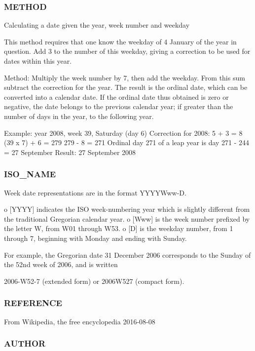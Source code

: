 \subsubsection*{M\+E\+T\+H\+OD}

Calculating a date given the year, week number and weekday

This method requires that one know the weekday of 4 January of the year in question. Add 3 to the number of this weekday, giving a correction to be used for dates within this year.

Method\+: Multiply the week number by 7, then add the weekday. From this sum subtract the correction for the year. The result is the ordinal date, which can be converted into a calendar date. If the ordinal date thus obtained is zero or negative, the date belongs to the previous calendar year; if greater than the number of days in the year, to the following year.

Example\+: year 2008, week 39, Saturday (day 6) Correction for 2008\+: 5 + 3 = 8 (39 x 7) + 6 = 279 279 -\/ 8 = 271 Ordinal day 271 of a leap year is day 271 -\/ 244 = 27 September Result\+: 27 September 2008

\subsubsection*{I\+S\+O\+\_\+\+N\+A\+ME}

Week date representations are in the format Y\+Y\+Y\+Y\+Www-\/D.

o \mbox{[}Y\+Y\+YY\mbox{]} indicates the I\+SO week-\/numbering year which is slightly different from the traditional Gregorian calendar year. o \mbox{[}Www\mbox{]} is the week number prefixed by the letter W, from W01 through W53. o \mbox{[}D\mbox{]} is the weekday number, from 1 through 7, beginning with Monday and ending with Sunday.

For example, the Gregorian date 31 December 2006 corresponds to the Sunday of the 52nd week of 2006, and is written

2006-\/\+W52-\/7 (extended form) or 2006\+W527 (compact form).

\subsubsection*{R\+E\+F\+E\+R\+E\+N\+CE}

From Wikipedia, the free encyclopedia 2016-\/08-\/08

\subsubsection*{A\+U\+T\+H\+OR}

